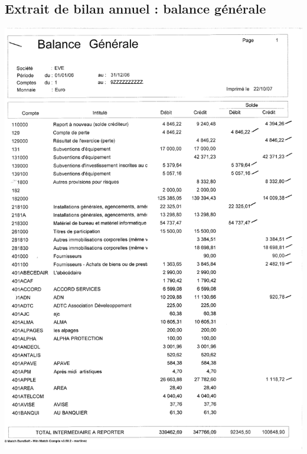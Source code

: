 \subsection{Extrait de bilan annuel : balance générale}
\begin{center}
\includegraphics[scale=0.7]{annexes/images/bilan_annuel_balance_generale.pdf}
\end{center}
